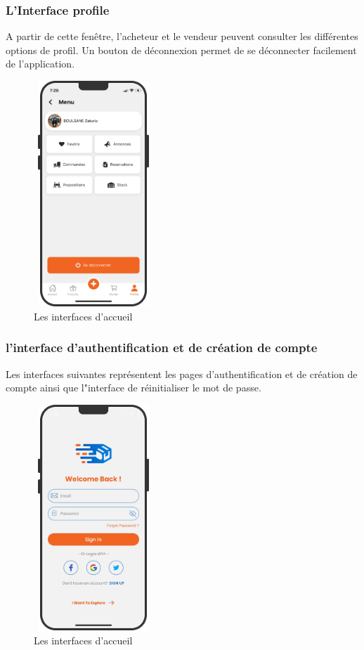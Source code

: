 \documentclass[edit,12pt,a4paper,ChapStyle,oneside,doubleinterligne]{report}
\begin{document}
\subsubsection{L'Interface profile}
A partir de cette fenêtre, l'acheteur et le vendeur peuvent consulter les différentes options de profil. Un bouton de déconnexion permet de se déconnecter facilement de l'application.
  \begin{figure} [H]
    \centering
    \includegraphics[width=4.5cm , height = 8.5cm , angle=360]{images/app profil.png}
    \caption{Les interfaces d'accueil}
    \label{fig:colors}
\end{figure}

\subsubsection{l'interface d'authentification et de création de compte}
Les interfaces suivantes représentent les pages d'authentification et de création de compte ainsi que l"interface de réinitialiser le mot de passe.
  \begin{figure} [H]
    \centering
    \includegraphics[width=4.5cm , height = 8.5cm , angle=360]{images/app signin.png}
    \caption{Les interfaces d'accueil}
    \label{fig:colors}
\end{figure}
\end{document}
